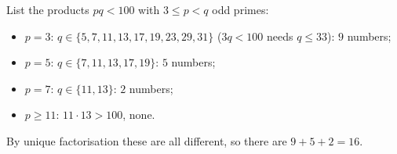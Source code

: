 List the products $pq<100$ with $3\le p<q$ odd primes:
\begin{itemize}
\item $p=3$: $q\in\{5,7,11,13,17,19,23,29,31\}$ ($3q<100$ needs $q\le33$): $9$ numbers;
\item $p=5$: $q\in\{7,11,13,17,19\}$: $5$ numbers;
\item $p=7$: $q\in\{11,13\}$: $2$ numbers;
\item $p\ge11$: $11\cdot13>100$, none.
\end{itemize}
By unique factorisation these are all different, so there are $9+5+2=\boxed{16}$.
